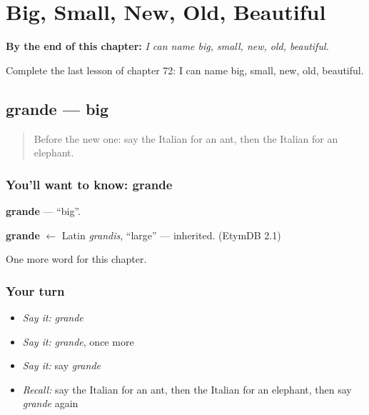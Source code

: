 
\chapter{Big, Small, New, Old, Beautiful}
\label{ch:it-big-small-new-old-beautiful}

\begin{chapteropening}
\textbf{By the end of this chapter:} \emph{I can name big, small, new, old, beautiful.}

Complete the last lesson of chapter 72: I can name big, small, new, old, beautiful.
\end{chapteropening}

\section[grande]{grande — big}

\label{lesson:IT-C72-grande}



\begin{quote}
Before the new one: say the Italian for an ant, then the Italian for an elephant.
\end{quote}

\subsection*{You'll want to know: grande}
\textbf{grande} — \textquotedblleft{}big\textquotedblright{}.

\begin{cousinweb}
\textbf{grande} $\leftarrow$ Latin \emph{grandis}, \textquotedblleft{}large\textquotedblright{} — inherited. (EtymDB 2.1)
\end{cousinweb}

\begin{grammarlens}[title={What you've built}]
One more word for this chapter.
\end{grammarlens}

\subsection*{Your turn}
\begin{itemize}
\raggedright
  \item \emph{Say it:} \emph{grande}
  \item \emph{Say it:} \emph{grande}, once more
  \item \emph{Say it:} say \emph{grande}
  \item \emph{Recall:} say the Italian for an ant, then the Italian for an elephant, then say \emph{grande} again
\end{itemize}

